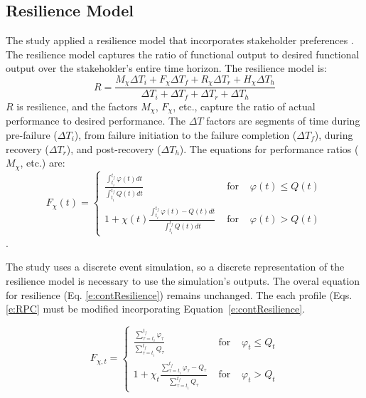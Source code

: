 \documentclass[preprint,12pt]{elsarticle}
\begin{document}
\subsection{Resilience Model}

The study applied a resilience model that incorporates
stakeholder preferences \cite{Ayyub2014a,Emanuel2017,emanuel2018,emanuel2019}.
The resilience model captures the ratio of functional
output to desired functional output over the stakeholder's entire time
horizon. The resilience model is:
\begin{equation}
  \label{e:contResilience}
    R = \frac{M_{\chi} \Delta T_i + F_{\chi} \Delta T_f + R_{\chi}
    \Delta T_r + H_{\chi} \Delta T_h}
  {\Delta T_i + \Delta T_f + \Delta T_r + \Delta T_h}
\end{equation}
$R$ is resilience, and the factors $M_{\chi}$, $F_{\chi}$, etc.,
capture the ratio of actual performance to desired performance. The
$\Delta T$ factors are segments of time during pre-failure ($\Delta
T_i$), from failure initiation to the failure completion ($\Delta
T_f$), during recovery ($\Delta T_r$), and post-recovery ($\Delta
T_h$).  The equations for performance ratios ($M_{\chi}$, etc.) are:
\begin{equation}
  \label{e:RPC}
  F_{\chi}(t) = \left\{\begin{array}{lcr}
      \frac{\displaystyle\int_{t_i}^{t_f}\varphi(t)dt}{\displaystyle\int_{t_i}^{t_f}Q(t)dt}
      & \text{ for } & \varphi(t) \leq Q(t) \\
      1 + \chi(t)
      \frac{\displaystyle\int_{t_i}^{t_f}\varphi(t)-Q(t)dt}{\displaystyle\int_{t_i}^{t_f}Q(t)dt}
      & \text{ for } & \varphi(t) > Q(t)
      \end{array}\right.
\end{equation}.


The study uses a discrete event simulation, so a discrete
representation of the resilience model is necessary to use the
simulation's outputs. The overal equation for resilience
(Eq. \ref{e:contResilience}) remains unchanged. The 
each profile (Eqs. \ref{e:RPC} must be modified incorporating
Equation~\ref{e:contResilience}.

\begin{equation}
% 
% 
  \label{e:RPD}
  F_{\chi,t} = \left\{\begin{array}{lcr}
    \frac{\displaystyle\sum_{\tau=t_{i}}^{t_f}\varphi_{\tau}}{\displaystyle\sum_{\tau=t_i}^{t_f}Q_{\tau}}
    & \text{ for } &
    \varphi_{t} \leq Q_t \\
      1 + \chi_t
      \frac{\displaystyle\sum_{\tau = t_i}^{t_f}\varphi_{\tau}-Q_{\tau}}{\displaystyle\sum_{\tau = t_i}^{t_f}Q_{\tau}}
      & \text{ for } &
      \varphi_{t} > Q_{t}
  \end{array}\right.
\end{equation}
\end{document}
